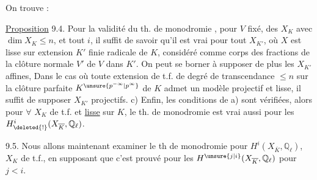 On trouve :

\uline{Proposition} 9.4.  Pour  la validité du th. de monodromie , pour $V$ fixé,  des $X_K$ avec $\dim X_K\leq n$, et tout $i$, il suffit de savoir qu'il est vrai pour tout $X_{K'}$, où $X$ est lisse  sur   extension $K'$ finie radicale de $K$, considéré comme corps des fractions de la clôture normale $V'$ de $V$ dans $K'$.  On peut  se borner à supposer de plus les $X_{K'}$ affines,   Dans le cas où  toute extension de t.f. de degré de transcendance $\leq n$ sur la clôture parfaite $K^{\unsure{p^{-\infty}|p^\infty}}$ de $K$ admet un modèle projectif et lisse, il suffit de supposer  $X_{K'}$ projectifs. c) Enfin,  les conditions   de a) sont vérifiées, alors pour $\forall$ $X_K$ de t.f. et \uline{lisse} sur $K$,  le th. de monodromie est vrai aussi pour les $H^i_{\deleted{!}}(X_{\overline K},\mathbb Q_\ell)$.

9.5. Nous allons maintenant examiner le th de monodromie pour $H^i(X_{\overline K},\mathbb Q_\ell)$,   $X_K$ de t.f., en supposant que  c'est prouvé pour les  $H^{\unsure{j|i}}(X_{\overline K},\mathbb Q_\ell)$ pour $j<i$.
